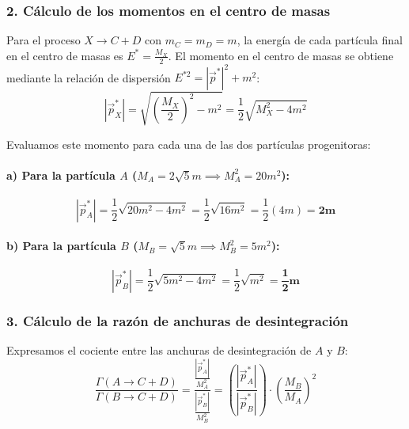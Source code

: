 \begin{problema}
\subsubsection*{2. Cálculo de los momentos en el centro de masas}

Para el proceso $X \rightarrow C + D$ con $m_C = m_D = m$, la energía de cada partícula final en el centro de masas es $E^* = \frac{M_X}{2}$. El momento en el centro de masas se obtiene mediante la relación de dispersión $E^{*2} = |\vec{p}^*|^2 + m^2$:
\begin{equation*}
|\vec{p}^*_X| = \sqrt{\left(\frac{M_X}{2}\right)^2 - m^2} = \frac{1}{2} \sqrt{M_X^2 - 4m^2}
\end{equation*}

Evaluamos este momento para cada una de las dos partículas progenitoras:

\paragraph{a) Para la partícula $A$ ($M_A = 2\sqrt{5} m \implies M_A^2 = 20 m^2$):}
\begin{equation*}
|\vec{p}^*_A| = \frac{1}{2} \sqrt{20 m^2 - 4 m^2} = \frac{1}{2} \sqrt{16 m^2} = \frac{1}{2} (4 m) = \mathbf{2 m}
\end{equation*}

\paragraph{b) Para la partícula $B$ ($M_B = \sqrt{5} m \implies M_B^2 = 5 m^2$):}
\begin{equation*}
|\vec{p}^*_B| = \frac{1}{2} \sqrt{5 m^2 - 4 m^2} = \frac{1}{2} \sqrt{m^2} = \mathbf{\frac{1}{2} m}
\end{equation*}

\subsubsection*{3. Cálculo de la razón de anchuras de desintegración}

Expresamos el cociente entre las anchuras de desintegración de $A$ y $B$:
\begin{equation*}
\frac{\Gamma(A \rightarrow C + D)}{\Gamma(B \rightarrow C + D)} = \frac{\frac{|\vec{p}^*_A|}{M_A^2}}{\frac{|\vec{p}^*_B|}{M_B^2}} = \left( \frac{|\vec{p}^*_A|}{|\vec{p}^*_B|} \right) \cdot \left( \frac{M_B}{M_A} \right)^2
\end{equation*}


\end{problema}
